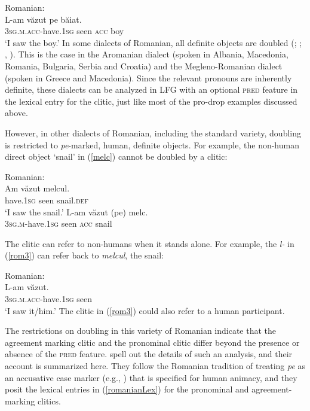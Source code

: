 \documentclass[output=paper,hidelinks]{langscibook}
\begin{document}
 
\ea \label{rom2} Romanian:\\
\gll   L-am v\u{a}zut pe b\u{a}iat. \\
3\textsc{sg.m.acc}-have.1\textsc{sg} seen \textsc{acc} boy  \\
\glt `I saw the boy.'
 \z
 In some dialects of Romanian, all definite objects are doubled (\citealt[Chapter~4]{tomic2006}; \citealt[84]{tomic2008}; \citealt{hill2013}, \citealt{BarbuToivonen2018}).     This is the case in  the Aromanian dialect  (spoken in Albania, Macedonia, Romania, Bulgaria, Serbia and Croatia) and the  Megleno-Romanian dialect  (spoken in Greece and Macedonia).  Since the relevant pronouns are inherently definite, these dialects can be  analyzed in LFG  with an optional \textsc{pred} feature in the lexical entry for the clitic, just like  most of the pro-drop examples discussed above. 
 
However, in other dialects of Romanian, including the standard variety,  doubling is restricted to \textit{pe}-marked, human, definite objects. For example, the non-human direct object  `snail' in (\ref{melc}) cannot be doubled by a clitic: 

\ea \label{melc}Romanian:\\
\ea \gll  Am v\u{a}zut   melcul. \\
 have.1\textsc{sg} seen  snail.\textsc{def}   \\
\glt `I saw the snail.'
\ex   \gll *L-am v\u{a}zut (pe) melc. \\
3\textsc{sg.m}-have.1\textsc{sg} seen \textsc{acc} snail   \\
\z\z

The clitic   can refer to non-humans when it stands alone.  For example, the \textit{l-} in (\ref{rom3}) can refer back to \textit{melcul}, the snail: 

\ea \label{rom3} Romanian:\\
\gll   L-am v\u{a}zut. \\
3\textsc{sg.m.acc}-have.1\textsc{sg} seen   \\
\glt `I saw it/him.'
 \z
The clitic in (\ref{rom3}) could also refer to a human participant.

The restrictions on doubling  in  this variety of Romanian indicate that the agreement marking clitic and the pronominal clitic differ beyond the presence or absence of the \textsc{pred} feature. \citet{BarbuToivonen2018} spell out the details of such an analysis, and their account is summarized here.    They follow the   Romanian tradition of treating  \textit{pe} as an accusative case  marker (e.g., \citealt{cornilescu2000})  that  is  specified for  human animacy, and they posit the lexical entries in (\ref{romanianLex}) for the pronominal and agreement-marking clitics. 
\end{document}

